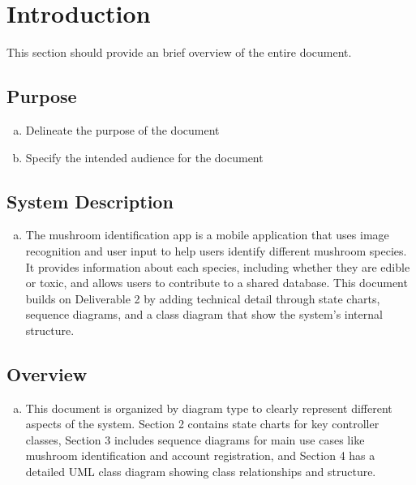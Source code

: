 \documentclass[]{article}
\begin{document}
\section{Introduction}
\label{sec:introduction}

This section should provide an brief overview of the entire document.

\subsection{Purpose}
\label{sub:purpose}
\begin{enumerate}[a)]
	\item Delineate the purpose of the document
	\item Specify the intended audience for the document
\end{enumerate}

\subsection{System Description}
\label{sub:system_description}
\begin{enumerate}[a)]
	\item The mushroom identification app is a mobile application that uses image recognition and user input to help users identify different mushroom species. It provides information about each species, including whether they are edible or toxic, and allows users to contribute to a shared database. This document builds on Deliverable 2 by adding technical detail through state charts, sequence diagrams, and a class diagram that show the system’s internal structure.
\end{enumerate}

\subsection{Overview}
\label{sub:overview}
\begin{enumerate}[a)]
	\item This document is organized by diagram type to clearly represent different aspects of the system. Section 2 contains state charts for key controller classes, Section 3 includes sequence diagrams for main use cases like mushroom identification and account registration, and Section 4 has a detailed UML class diagram showing class relationships and structure.
\end{enumerate}
\end{document}
